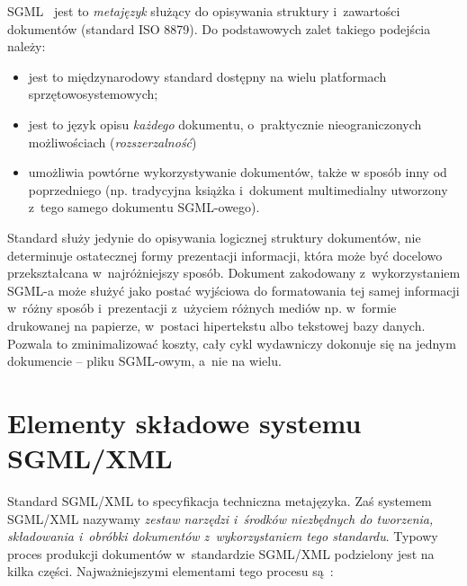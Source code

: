 \documentclass[skorowidz,palatino,brudnopis,xodstep]{wimgr}
\begin{document}
SGML~\cite{Goldfarb} jest to \emph{metajęzyk} służący do opisywania
struktury i~zawartości dokumentów (standard ISO 8879).  Do
podstawowych zalet takiego podejścia należy: 
\begin{itemize}
\item
jest to międzynarodowy
standard dostępny na wielu platformach sprzętowo{\dywiz}systemowych;
\item
jest to
język opisu \emph{każdego\/} dokumentu, o~praktycznie nieograniczonych
możliwościach (\emph{rozszerzalność\/}) 
\item
umożliwia powtórne
wykorzystywanie dokumentów, także w sposób inny od poprzedniego
(np. tradycyjna książka i~dokument multimedialny utworzony z~tego
samego dokumentu SGML-owego).
\end{itemize}

Standard służy jedynie do opisywania logicznej struktury dokumentów,
nie determinuje ostatecznej formy prezentacji informacji, która może
być docelowo przekształcana w~najróżniejszy sposób. Dokument
zakodowany z~wykorzystaniem SGML-a może służyć jako postać wyjściowa
do formatowania tej samej informacji w~różny sposób i~prezentacji
z~użyciem różnych mediów np. w~formie drukowanej na papierze,
w~postaci hipertekstu albo tekstowej bazy danych. Pozwala to
zminimalizować koszty, cały cykl wydawniczy dokonuje się
na jednym dokumencie -- pliku SGML-owym, a~nie na wielu.
    
\section{Elementy składowe systemu SGML/XML}

Standard SGML/XML to specyfikacja techniczna metajęzyka. Zaś systemem
SGML/XML nazywamy \emph{zestaw narzędzi i~środków niezbędnych do
tworzenia, składowania i~obróbki dokumentów z~wykorzystaniem tego
standardu}.  Typowy proces produkcji dokumentów w~standardzie SGML/XML
podzielony jest na kilka części. Najważniejszymi elementami tego
procesu są~\cite[s.~45--47]{maler.devel}:
    
\end{document}
